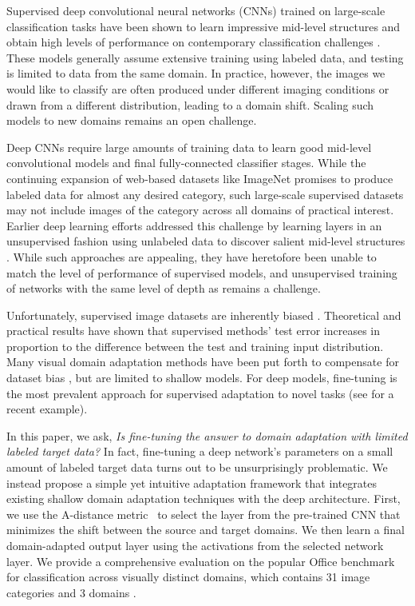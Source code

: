 
Supervised deep convolutional neural networks (CNNs) trained on large-scale
classification tasks have been shown to learn impressive mid-level structures
and obtain high levels of performance on contemporary classification
challenges \cite{ilsvrc2012,zeiler-arxiv-2013}. These models generally assume
extensive training using labeled data, and testing is limited to data from the
same domain. In practice, however, the images we would like to classify are
often produced under different imaging conditions or drawn from a different
distribution, leading to a domain shift. Scaling such models to new domains
remains an open challenge.

Deep CNNs require large amounts of training data to learn
good mid-level convolutional models and final fully-connected classifier
stages. While the continuing expansion of web-based datasets like
ImageNet \cite{ilsvrc2012} promises to produce labeled data for almost any desired
category, such large-scale supervised datasets
may not include images of the category across all
domains of practical interest. Earlier deep learning efforts addressed this
challenge by learning layers in an unsupervised fashion using unlabeled data to
discover salient mid-level structures \cite{coates-nips12, dean-nips12}. While such approaches are appealing, they
have heretofore been unable to match the level of performance of supervised
models, and unsupervised training of networks with the same level of depth
as \cite{supervision} remains a challenge.

 
Unfortunately, supervised image datasets are inherently biased \cite{efros-cvpr11}. 
Theoretical \cite{ben2007analysis, blitzer2007learning} and practical results \cite{saenko-eccv10,efros-cvpr11} have shown that supervised methods' test error increases in proportion to the difference between the test and training input distribution. 
Many visual domain adaptation methods have been put forth to compensate for dataset bias \cite{daume,yang-icdm07,aytar-iccv11,saenko-eccv10,kulis-cvpr11,Khosla-eccv12,gopalan-iccv11,gong-cvpr12,hoffman-eccv12,hoffman-iclr13}, but are limited to shallow models. For deep models, fine-tuning is the most prevalent approach for supervised adaptation to novel tasks (see \cite{rcnn} for a recent example). 

In this paper, we ask, \textit{Is fine-tuning the answer to domain adaptation with limited labeled target data?}
In fact, fine-tuning a deep network's parameters on a small amount of labeled target data turns out to be unsurprisingly
problematic. We instead propose a simple yet intuitive adaptation framework that integrates existing shallow domain adaptation techniques with the deep architecture.
First, we use the A-distance metric~\cite{adist} to select the layer from the
pre-trained CNN that minimizes the shift between the source and target domains.  We then learn a final domain-adapted output layer using the activations
from the selected network layer.  
We provide a comprehensive evaluation on the popular Office benchmark for classification across visually distinct domains, which contains 31 image categories and 3 domains \cite{saenko-eccv10}. 


